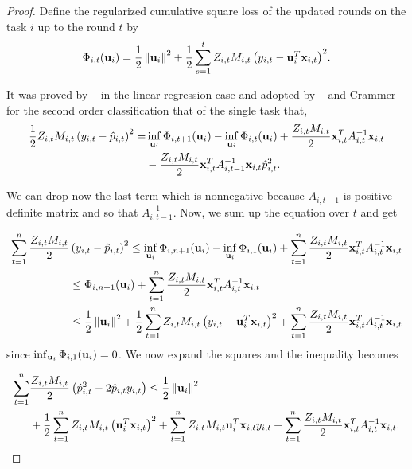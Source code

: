 \begin{proof}
Define the regularized cumulative square loss of the updated rounds on the task 
$i$ up to the round $t$ by
\begin{equation*}
\Phi_{i,t}(\mathbf{u}_i)=\frac{1}{2}\left\Vert {\mathbf{u}_i} \right\Vert^2+\frac{1}{2}\sum_{s=1}^{t}{Z_{i,t}M_{i,t}\left({y_{i,t}-\mathbf{u}_i^T\mathbf{x}_{i,t}}\right)}^2.
\end{equation*}

\noindent
It was proved by ~\cite{Forster} in the linear regression case and adopted by
~\cite{cesa2006worst} and Crammer ~\cite{crammer2014doubly} for the second order classification that of 
the single task that,
\begin{equation*}
\begin{split}
\frac{1}{2} Z_{i,t}M_{i,t}\left({y_{i,t}-\hat{p}_{i,t}}\right)^{2}= &\inf_{\mathbf{u}_i}{\Phi_{i,t+1}}(\mathbf{u}_i)-\inf_{\mathbf{u}_i}{\Phi_{i,t}}(\mathbf{u}_i)
+\frac{Z_{i,t}M_{i,t}}{2}\mathbf{x}_{i,t}^TA_{i,t}^{-1}\mathbf{x}_{i,t}\\
&-\frac{Z_{i,t}M_{i,t}}{2}\mathbf{x}_{i,t}^TA_{i,t-1}^{-1}\mathbf{x}_{i,t}\hat{p}_{i,t}^2.
\end{split}
\end{equation*} 

\noindent
We can drop now the last term which is nonnegative because $A_{i,t-1}$ is 
positive definite matrix and so that $A_{i,t-1}^{-1}$.
Now, we sum up the equation over $t$ and get

\begin{equation*}
 \begin{split}
\sum_{t=1}^{n}\frac{Z_{i,t}M_{i,t}}{2}&\left({y_{i,t}-\hat{p}_{i,t}}\right)^{2} \le \inf_{\mathbf{u}_i}{\Phi_{i,n+1}}(\mathbf{u}_i)
-\inf_{\mathbf{u}_i}{\Phi_{i,1}}(\mathbf{u}_i)+\sum_{t=1}^{n}\frac{Z_{i,t}M_{i,t}}{2}\mathbf{x}_{i,t}^TA_{i,t}^{-1}\mathbf{x}_{i,t}\\
&\le  \Phi_{i,n+1}(\mathbf{u}_i)+\sum_{t=1}^{n}\frac{Z_{i,t}M_{i,t}}{2}\mathbf{x}_{i,t}^TA_{i,t}^{-1}\mathbf{x}_{i,t}\\
&\le  \frac{1}{2}\left\Vert {\mathbf{u}_i} \right\Vert^2+\frac{1}{2}\sum_{t=1}^{n}{Z_{i,t}M_{i,t}\left({y_{i,t}-\mathbf{u}_i^T\mathbf{x}_{i,t}}\right)}^2+
\sum_{t=1}^{n}\frac{Z_{i,t}M_{i,t}}{2}\mathbf{x}_{i,t}^TA_{i,t}^{-1}\mathbf{x}_{i,t}\\
\end{split}
\end{equation*} 
since $\inf_{\mathbf{u}_i}{\Phi_{i,1}}(\mathbf{u}_i)=0$. We now expand the squares and the 
inequality becomes

\begin{equation} \label{eq:so_first_step}
 \begin{split}
   \sum_{t=1}^{n}&\frac{Z_{i,t}M_{i,t}}{2}\left({\hat{p}_{i,t}^2-2\hat{p}_{i,t}y_{i,t}}\right)
   \le  \frac{1}{2}\left\Vert {\mathbf{u}_i} \right\Vert^2 \\
   &+\frac{1}{2}\sum_{t=1}^{n}{Z_{i,t}M_{i,t}\left({\mathbf{u}_i^T\mathbf{x}_{i,t}}\right)}^2 
   +\sum_{t=1}^{n}{Z_{i,t}M_{i,t}\mathbf{u}_i^T\mathbf{x}_{i,t}y_{i,t}}
+\sum_{t=1}^{n}\frac{Z_{i,t}M_{i,t}}{2}\mathbf{x}_{i,t}^TA_{i,t}^{-1}\mathbf{x}_{i,t}.\\
\end{split}
\end{equation} 


\end{proof}

